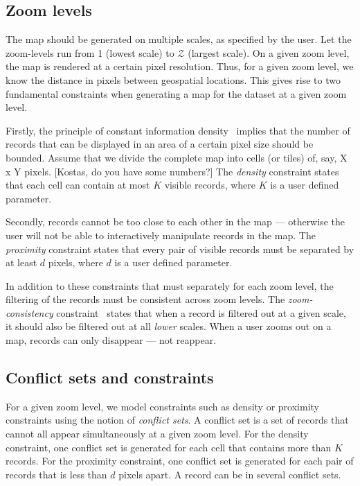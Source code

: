 \subsection{Zoom levels}
\label{sec:zoomlevels}


The map should be generated on multiple scales, as specified by the user. Let the zoom-levels run from 1 (lowest scale) to $\mathcal{Z}$ (largest scale). On a given zoom level, the map is rendered at a certain pixel resolution. Thus, for a given zoom level, we know the distance in pixels between geospatial locations. This gives rise to two fundamental constraints when generating a map for the dataset at a given zoom level.

Firstly, the principle of constant information density~\cite{something} implies that the number of records that can be displayed in an area of a certain pixel size should be bounded. Assume that we divide the complete map into cells (or tiles) of, say, X x Y pixels. [Kostas, do you have some numbers?] The \emph{density} constraint states that each cell can contain at most $K$ visible records, where $K$ is a user defined parameter.

Secondly, records cannot be too close to each other in the map --- otherwise the user will not be able to interactively manipulate records in the map. The \emph{proximity} constraint states that every pair of visible records must be separated by at least $d$ pixels, where $d$ is a user defined parameter.

In addition to these constraints that must separately for each zoom level, the filtering of the records must be consistent across zoom levels. The \emph{zoom-consistency} constraint~\cite{fusiontables} states that when a record is filtered out at a given scale, it should also be filtered out at all \emph{lower} scales. When a user zooms out on a map, records can only disappear --- not reappear.

\subsection{Conflict sets and constraints}
\label{sec:conflicts}

For a given zoom level, we model constraints such as density or proximity constraints using the notion of \emph{conflict sets}. A conflict set is a set of records that cannot all appear simultaneously at a given zoom level. For the density constraint, one conflict set is generated for each cell that contains more than $K$ records. For the proximity constraint, one conflict set is generated for each pair of records that is less than $d$ pixels apart. A record can be in several conflict sets.

